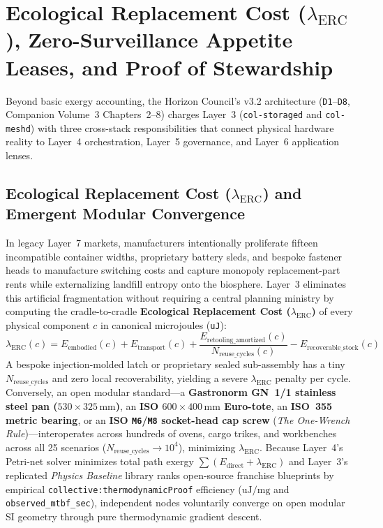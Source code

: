 \section{Ecological Replacement Cost (\texorpdfstring{$\lambda_{\mathrm{ERC}}$}{Lambda ERC}), Zero-Surveillance Appetite Leases, and Proof of Stewardship}
\label{sec:l3-erc-appetite-stewardship}

Beyond basic exergy accounting, the Horizon Council's v3.2 architecture (\texttt{D1}--\texttt{D8}, Companion Volume~3 Chapters~2--8) charges Layer~3 (\texttt{col-storaged} and \texttt{col-meshd}) with three cross-stack responsibilities that connect physical hardware reality to Layer~4 orchestration, Layer~5 governance, and Layer~6 application lenses.

\subsection{Ecological Replacement Cost (\texorpdfstring{$\lambda_{\mathrm{ERC}}$}{Lambda ERC}) and Emergent Modular Convergence}
\label{subsec:l3-erc-convergence}

In legacy Layer~7 markets, manufacturers intentionally proliferate fifteen incompatible container widths, proprietary battery sleds, and bespoke fastener heads to manufacture switching costs and capture monopoly replacement-part rents while externalizing landfill entropy onto the biosphere. Layer~3 eliminates this artificial fragmentation without requiring a central planning ministry by computing the cradle-to-cradle \textbf{Ecological Replacement Cost ($\lambda_{\mathrm{ERC}}$)} of every physical component $c$ in canonical microjoules (\texttt{uJ}):
\begin{equation}
\lambda_{\mathrm{ERC}}(c) = E_{\mathrm{embodied}}(c) + E_{\mathrm{transport}}(c) + \frac{E_{\mathrm{retooling\_amortized}}(c)}{N_{\mathrm{reuse\_cycles}}(c)} - E_{\mathrm{recoverable\_stock}}(c)
\label{eq:ch4_erc_formula}
\end{equation}
A bespoke injection-molded latch or proprietary sealed sub-assembly has a tiny $N_{\mathrm{reuse\_cycles}}$ and zero local recoverability, yielding a severe $\lambda_{\mathrm{ERC}}$ penalty per cycle. Conversely, an open modular standard---a \textbf{Gastronorm GN~1/1 stainless steel pan ($530 \times 325\,\mathrm{mm}$)}, an \textbf{ISO $600 \times 400\,\mathrm{mm}$ Euro-tote}, an \textbf{ISO~355 metric bearing}, or an \textbf{ISO \texttt{M6}/\texttt{M8} socket-head cap screw} (\textit{The One-Wrench Rule})---interoperates across hundreds of ovens, cargo trikes, and workbenches across all 25 scenarios ($N_{\mathrm{reuse\_cycles}} \to 10^4$), minimizing $\lambda_{\mathrm{ERC}}$. Because Layer~4's Petri-net solver minimizes total path exergy $\sum (E_{\mathrm{direct}} + \lambda_{\mathrm{ERC}})$ and Layer~3's replicated \textit{Physics Baseline} library ranks open-source franchise blueprints by empirical \texttt{collective:thermodynamicProof} efficiency ($\mathrm{uJ/mg}$ and \texttt{observed\_mtbf\_sec}), independent nodes voluntarily converge on open modular SI geometry through pure thermodynamic gradient descent.

